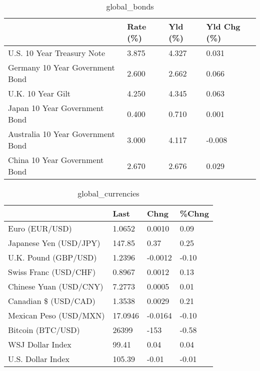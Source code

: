 \documentclass{article}%
\begin{document}
%


\begin{table}[htbp]%
\caption{global\_bonds}%
\centering%
\begin{adjustbox}{width=1\textwidth}%
\begin{tabular}{llll}
\toprule
                                  & Rate (\%) & Yld (\%) & Yld Chg (\%) \\
\midrule
       U.S. 10 Year Treasury Note &    3.875 &   4.327 &       0.031 \\
  Germany 10 Year Government Bond &    2.600 &   2.662 &       0.066 \\
                U.K. 10 Year Gilt &    4.250 &   4.345 &       0.063 \\
    Japan 10 Year Government Bond &    0.400 &   0.710 &       0.001 \\
Australia 10 Year Government Bond &    3.000 &   4.117 &      -0.008 \\
    China 10 Year Government Bond &    2.670 &   2.676 &       0.029 \\
\bottomrule
\end{tabular}
%
\end{adjustbox}%
\end{table}

%


\begin{table}[htbp]%
\caption{global\_currencies}%
\centering%
\begin{adjustbox}{width=1\textwidth}%
\begin{tabular}{llll}
\toprule
                       &    Last &    Chng & \%Chng \\
\midrule
        Euro (EUR/USD) &  1.0652 &  0.0010 &  0.09 \\
Japanese Yen (USD/JPY) &  147.85 &    0.37 &  0.25 \\
  U.K. Pound (GBP/USD) &  1.2396 & -0.0012 & -0.10 \\
 Swiss Franc (USD/CHF) &  0.8967 &  0.0012 &  0.13 \\
Chinese Yuan (USD/CNY) &  7.2773 &  0.0005 &  0.01 \\
  Canadian \$ (USD/CAD) &  1.3538 &  0.0029 &  0.21 \\
Mexican Peso (USD/MXN) & 17.0946 & -0.0164 & -0.10 \\
     Bitcoin (BTC/USD) &   26399 &    -153 & -0.58 \\
      WSJ Dollar Index &   99.41 &    0.04 &  0.04 \\
     U.S. Dollar Index &  105.39 &   -0.01 & -0.01 \\
\bottomrule
\end{tabular}
%
\end{adjustbox}%
\end{table}
\end{document}
